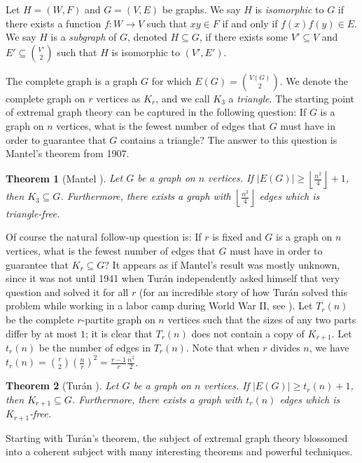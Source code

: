 \documentclass[oneside,12pt]{memoir}
\newtheorem{theorem}{Theorem}[section]
\newcommand{\floor}[1]{\left\lfloor#1\right\rfloor}
\begin{document}
Let $H=(W,F)$ and $G=(V, E)$ be graphs.  We say $H$ is \emph{isomorphic} to $G$ if there exists a function $f:W\to V$ such that $xy\in F$ if and only if $f(x)f(y)\in E$.  We say $H$ is a \emph{subgraph} of $G$, denoted $H\subseteq G$, if there exists some $V'\subseteq V$ and $E'\subseteq \binom{V'}{2}$ such that $H$ is isomorphic to $(V', E')$.  

The complete graph is a graph $G$ for which $E(G)=\binom{V(G)}{2}$.  We denote the complete graph on $r$ vertices as $K_r$, and we call $K_3$ a \emph{triangle}.  The starting point of extremal graph theory can be captured in the following question: If $G$ is a graph on $n$ vertices, what is the fewest number of edges that $G$ must have in order to guarantee that $G$ contains a triangle?  The answer to this question is Mantel's theorem from 1907.

\begin{theorem}[Mantel \cite{M}]
Let $G$ be a graph on $n$ vertices.  If $|E(G)|\geq \floor{\frac{n^2}{4}}+1$, then $K_3\subseteq G$.  Furthermore, there exists a graph with $\floor{\frac{n^2}{4}}$ edges which is triangle-free.
\end{theorem}

Of course the natural follow-up question is: If $r$ is fixed and $G$ is a graph on $n$ vertices, what is the fewest number of edges that $G$ must have in order to guarantee that $K_r\subseteq G$?  It appears as if Mantel's result was mostly unknown, since it was not until 1941 when Tur\'an independently asked himself that very question and solved it for all $r$ (for an incredible story of how Tur\'an solved this problem while working in a labor camp during World War II, see \cite{Twel}).  Let $T_r(n)$ be the complete $r$-partite graph on $n$ vertices such that the sizes of any two parts differ by at most $1$; it is clear that $T_r(n)$ does not contain a copy of $K_{r+1}$.  Let $t_r(n)$ be the number of edges in $T_r(n)$.  Note that when $r$ divides $n$, we have $t_r(n)=\binom{r}{2}\left(\frac{n}{r}\right)^2=\frac{r-1}{r}\frac{n^2}{2}$. 

\begin{theorem}[Tur\'an \cite{T}]
Let $G$ be a graph on $n$ vertices.  If $|E(G)|\geq t_r(n)+1$, then $K_{r+1}\subseteq G$.  Furthermore, there exists a graph with $t_r(n)$ edges which is $K_{r+1}$-free.
\end{theorem}

Starting with Tur\'an's theorem, the subject of extremal graph theory blossomed into a coherent subject with many interesting theorems and powerful techniques.
\end{document}
